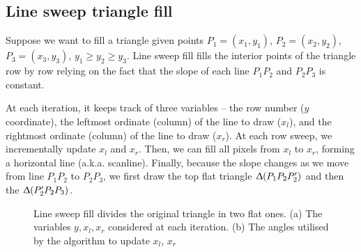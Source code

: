 \documentclass[a4paper]{article}
\begin{document}
\subsection{Line sweep triangle fill}

Suppose we want to fill a triangle given points $P_1=(x_1,y_1)$, $P_2=(x_2,y_2)$, $P_3=(x_3,y_3)$, $y_1 \geq y_2 \geq y_3$. Line sweep fill fills the interior points of the triangle row by row relying on the fact that the slope of each line $P_1P_2$ and $P_2P_3$ is constant.

At each iteration, it keeps track of three variables -- the row number ($y$ coordinate), the leftmost ordinate (column) of the line to draw ($x_l$), and  the rightmost ordinate (column) of the line to draw ($x_r$). At each row sweep, we incrementally update $x_l$ and $x_r$. Then, we can fill all pixels from $x_l$ to $x_r$, forming a horizontal line (a.k.a. scanline). Finally, because the slope changes as we move from line $P_1P_2$ to $P_2P_3$, we first draw the top flat triangle $\Updelta(P_1P_2P_2')$ and then the $\Updelta(P_2'P_2P_3)$. 

\begin{figure}[H]
    \centering
    \qquad
    \caption{Line sweep fill divides the original triangle in two flat ones. (a) The variables $y,x_l,x_r$ considered at each iteration. (b) The angles utilised by the algorithm to update $x_l$, $x_r$}%
    \label{fig:triangle_line_sweep_vars}%
\end{figure}
\end{document}
